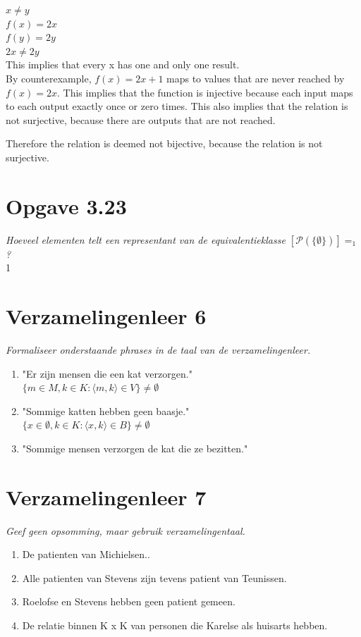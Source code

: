 \documentclass[11pt]{article}
\begin{document}
$ x \neq y $
\\
$ f(x) = 2x $
\\
$ f(y) = 2y $
\\
$ 2x \neq 2y $
\\

This implies that every x has one and only one result.
\\

By counterexample, $ f(x) = 2x + 1$ maps to values that are never reached by $ f(x) = 2x $. This implies that the function is injective because each input maps to each output exactly once or zero times. This also implies that the relation is not surjective, because there are outputs that are not reached.

Therefore the relation is deemed not bijective, because the relation is not surjective.

\section*{Opgave 3.23}
\textit{Hoeveel elementen telt een representant van de equivalentieklasse
$[\mathcal{P}(\{\emptyset\})]=_1  $ ?} \\

1

\section*{Verzamelingenleer 6}
\textit{Formaliseer onderstaande phrases in de taal van de verzamelingenleer.}

\begin{enumerate}
\item "Er zijn mensen die een kat verzorgen."
\\
$ \{m \in M, k \in K : \langle m, k \rangle \in V \} \neq \emptyset $
\item "Sommige katten hebben geen baasje."
\\
$ \{x \in \emptyset, k \in K : \langle x, k \rangle \in B \} \neq \emptyset $
\item "Sommige mensen verzorgen de kat die ze bezitten."
\end{enumerate}

\section*{Verzamelingenleer 7}
\textit{Geef geen opsomming, maar gebruik verzamelingentaal.}

\begin{enumerate}
\item De patienten van Michielsen..
\item Alle patienten van Stevens zijn tevens patient van Teunissen.
\item Roelofse en Stevens hebben geen patient gemeen.
\item De relatie binnen K x K van personen die Karelse als huisarts hebben.
\end{enumerate}
\end{document}
